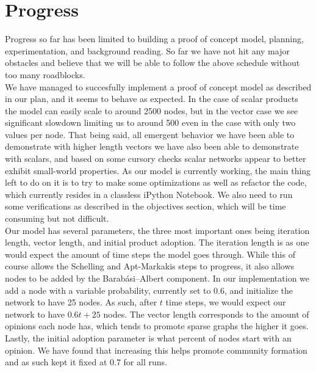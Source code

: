 \documentclass[10pt]{article}
\begin{document}
\pagebreak

\section{Progress}

Progress so far has been limited to building a proof of concept model, planning, experimentation, and background reading. So far we have not hit any major obstacles and believe that we will be able to follow the above schedule without too many roadblocks. \\

We have managed to succesfully implement a proof of concept model as described in our plan, and it seems to behave as expected. In the case of scalar products the model can easily scale to around 2500 nodes, but in the vector case we see significant slowdown limiting us to around 500 even in the case with only two values per node. That being said, all emergent behavior we have been able to demonstrate with higher length vectors we have also been able to demonstrate with scalars, and based on some cursory checks scalar networks appear to better exhibit small-world properties. As our model is currently working, the main thing left to do on it is to try to make some optimizations as well as refactor the code, which currently resides in a classless iPython Notebook. We also need to run some verifications as described in the objectives section, which will be time consuming but not difficult.  \\

Our model has several parameters, the three most important ones being iteration length, vector length, and initial product adoption. The iteration length is as one would expect the amount of time steps the model goes through. While this of course allows the Schelling and Apt-Markakis steps to progress, it also allows nodes to be added by the Barabási–Albert component. In our implementation we add a node with a variable probability, currently set to 0.6, and initialize the network to have 25 nodes. As such, after $t$ time steps, we would expect our network to have $0.6t + 25$ nodes. The vector length corresponds to the amount of opinions each node has, which tends to promote sparse graphs the higher it goes. Lastly, the initial adoption parameter is what percent of nodes start with an opinion. We have found that increasing this helps promote community formation and as such kept it fixed at 0.7 for all runs. \\
\end{document}
